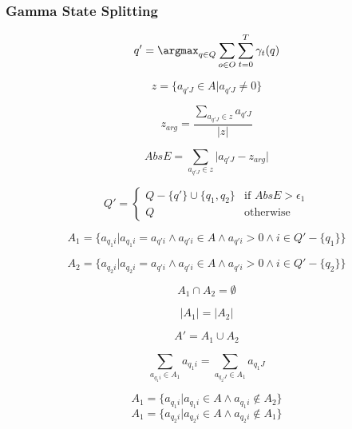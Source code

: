 \subsubsection{Gamma State Splitting}

$$q' = \argmax_{q \in Q}\sum_{o \in O}\sum_{t=0}^{T}\gamma_t(q)$$ 

$$z = \{a_{q'J} \in A \vert a_{q'J} \neq 0\}$$

$$z_{arg} = \frac{\sum_{a_{q'J} \in z} a_{q'J}}{\vert z \vert}$$

$$AbsE = \sum_{a_{q'J} \in z} \vert a_{q'J} - z_{arg} \vert$$

$$Q' = \begin{cases}
	Q-\{q'\} \cup \{ q_1,q_2 \} &\text{if } AbsE > \epsilon_1 \\
	Q	&\text{otherwise}
\end{cases}$$

% 
$$A_1 = \{a_{q_1i} \vert a_{q_1i} = a_{q'i} \wedge a_{q'i} \in A \wedge a_{q'i} >0 \wedge i \in Q' - \{q_1\}\}$$

$$A_2 = \{a_{q_2i} \vert a_{q_2i} = a_{q'i} \wedge a_{q'i} \in A \wedge a_{q'i} > 0 \wedge i \in Q' - \{q_2\}\}$$

$$A_1 \cap A_2 = \emptyset$$

$$\vert A_1 \vert = \vert A_2 \vert$$

$$A' = A_1 \cup A_2$$

$$\sum_{a_{q_1i} \in A_1} a_{q_1i} = \sum_{a_{q_2J} \in A_1} a_{q_1J}$$

$$A_1 = \{a_{q_1i} \vert a_{q_1i} \in A \wedge a_{q_1i} \notin A_2\}$$
	$$A_1 = \{a_{q_2i} \vert a_{q_2i} \in A \wedge a_{q_2i} \notin A_1\}$$



